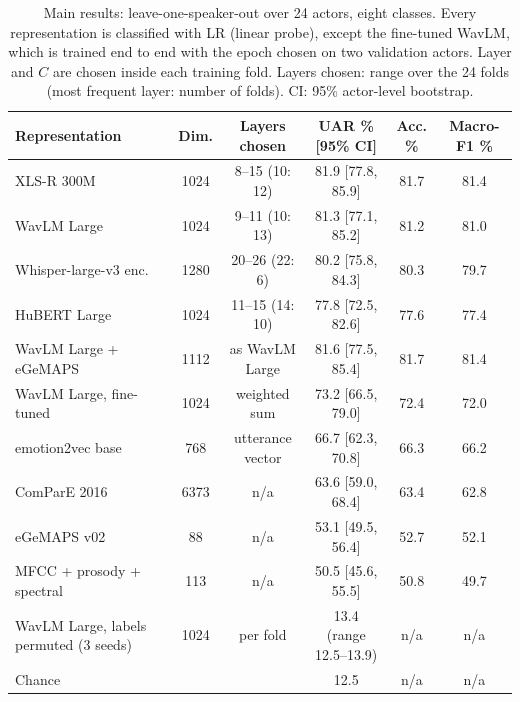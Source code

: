 \begin{table}[!t]
\centering
\caption{Main results: leave-one-speaker-out over 24 actors, eight classes. Every representation is classified with LR (linear probe), except the fine-tuned WavLM, which is trained end to end with the epoch chosen on two validation actors. Layer and $C$ are chosen inside each training fold. Layers chosen: range over the 24 folds (most frequent layer: number of folds). CI: 95\% actor-level bootstrap.}
\label{tab:main}
\begin{tabular}{lccccc}
\toprule
Representation & Dim. & Layers chosen & UAR \% [95\% CI] & Acc. \% & Macro-F1 \% \\
\midrule
XLS-R 300M & 1024 & 8--15 (10: 12) & 81.9 [77.8, 85.9] & 81.7 & 81.4 \\
WavLM Large & 1024 & 9--11 (10: 13) & 81.3 [77.1, 85.2] & 81.2 & 81.0 \\
Whisper-large-v3 enc. & 1280 & 20--26 (22: 6) & 80.2 [75.8, 84.3] & 80.3 & 79.7 \\
HuBERT Large & 1024 & 11--15 (14: 10) & 77.8 [72.5, 82.6] & 77.6 & 77.4 \\
WavLM Large + eGeMAPS & 1112 & as WavLM Large & 81.6 [77.5, 85.4] & 81.7 & 81.4 \\
WavLM Large, fine-tuned & 1024 & weighted sum & 73.2 [66.5, 79.0] & 72.4 & 72.0 \\
emotion2vec base & 768 & utterance vector & 66.7 [62.3, 70.8] & 66.3 & 66.2 \\
\midrule
ComParE 2016 & 6373 & n/a & 63.6 [59.0, 68.4] & 63.4 & 62.8 \\
eGeMAPS v02 & 88 & n/a & 53.1 [49.5, 56.4] & 52.7 & 52.1 \\
MFCC + prosody + spectral & 113 & n/a & 50.5 [45.6, 55.5] & 50.8 & 49.7 \\
\midrule
WavLM Large, labels permuted (3 seeds) & 1024 & per fold & 13.4 (range 12.5--13.9) & n/a & n/a \\
Chance & & & 12.5 & n/a & n/a \\
\bottomrule
\end{tabular}
\end{table}
